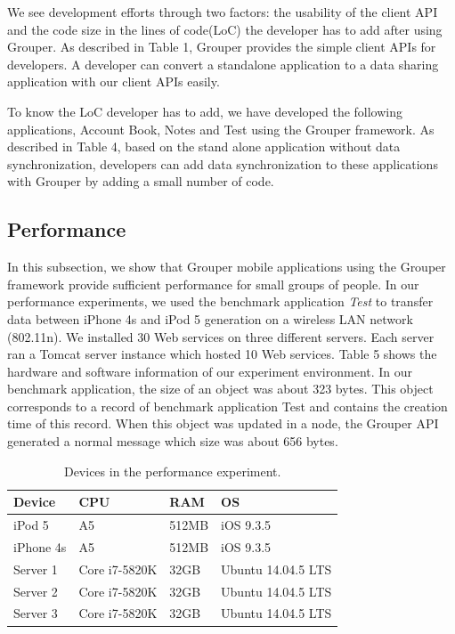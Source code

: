 \documentclass[twocolumn,10pt]{article}
\begin{document}
We see development efforts through two factors: the usability of the client API and the code size in the lines of code(LoC) the developer has to add after using Grouper. 
As described in Table 1, Grouper provides the simple client APIs for developers.
A developer can convert a standalone application to a data sharing application with our client APIs easily.

To know the LoC developer has to add, we have developed the following applications, Account Book, Notes and Test using the Grouper framework.
As described in Table 4, based on the stand alone application without data synchronization, developers can add data synchronization to these applications with Grouper by adding a small number of code. 

\subsection{Performance}

In this subsection, we show that Grouper mobile applications using the Grouper framework provide sufficient performance for small groups of people.
In our performance experiments, we used the benchmark application \emph{Test} to transfer data between iPhone 4s and iPod 5 generation on a wireless LAN network (802.11n).
We installed 30 Web services on three different servers.
Each server ran a Tomcat server instance which hosted 10 Web services.
Table 5 shows the hardware and software information of our experiment environment.
In our benchmark application, the size of an object was about 323 bytes.
This object corresponds to a record of benchmark application Test and contains the creation time of this record.
When this object was updated in a node, the Grouper API generated a normal message which size was about 656 bytes.

\begin{table}[t]
	\footnotesize
	\centering  
	\caption{Devices in the performance experiment.}
	\label{my-label}
	\begin{tabular}{llll}
		\hline
		\textbf{Device} & \textbf{CPU} & \textbf{RAM} & \textbf{OS} \\ \hline
		iPod 5 & A5 & 512MB & iOS 9.3.5 \\
		iPhone 4s & A5 & 512MB & iOS 9.3.5 \\
		Server 1 & Core i7-5820K & 32GB & Ubuntu 14.04.5 LTS \\
		Server 2 & Core i7-5820K & 32GB & Ubuntu 14.04.5 LTS \\
		Server 3 & Core i7-5820K & 32GB & Ubuntu 14.04.5 LTS \\ \hline
	\end{tabular}
\end{table}
\end{document}
